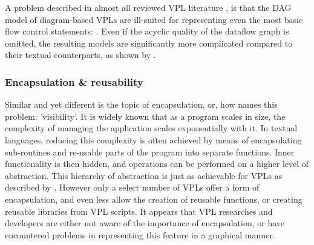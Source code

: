 A problem described in almost all reviewed VPL literature \citep{green_usability_1996,sousa_dataflow_2012, kuhail_characterizing_2021}, is that the \ac{DAG} model of diagram-based VPLs are ill-suited for representing even the most basic flow control statements: .
Even if the acyclic quality of the dataflow graph is omitted, the resulting models are significantly more complicated compared to their textual counterparts, as shown by .

\subsubsection*{Encapsulation \& reusability}
Similar and yet different is the topic of encapsulation, or, how \citet{green_usability_1996} names this problem: 'visibility'.
It is widely known that as a program scales in size, the complexity of managing the application scales exponentially with it.
In textual languages, reducing this complexity is often achieved by means of encapsulating sub-routines and re-usable parts of the program into separate functions.
Inner functionality is then hidden, and operations can be performed on a higher level of abstraction. 
This hierarchy of abstraction is just as achievable for \ac{VPL}s as described by \citet{sousa_dataflow_2012}.
However only a select number of \ac{VPL}s offer a form of encapsulation, and even less allow the creation of reusable functions, or creating reusable libraries from VPL scripts.
It appears that \ac{VPL} researches and developers are either not aware of the importance of encapsulation, or have encountered problems in representing this feature in a graphical manner.


